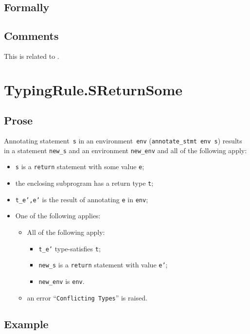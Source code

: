 \documentclass{book}
\begin{document}
\begin{emptyformal}
    \subsection{Formally}      
\end{emptyformal}

\subsection{Comments}
    This is related to .

\section{TypingRule.SReturnSome \label{sec:TypingRule.SReturnSome}}

  \subsection{Prose}
Annotating statement~\texttt{s} in an environment~\texttt{env}
(\texttt{annotate\_stmt env s}) results in a statement \texttt{new\_s} and an
environment \texttt{new\_env} and all of the following apply:
   \begin{itemize}
   \item \texttt{s} is a \texttt{return} statement with some value \texttt{e};
   \item the enclosing subprogram has a return type \texttt{t};
   \item \texttt{t\_e',e'} is the result of annotating \texttt{e} in \texttt{env};
   \item One of the following applies:
     \begin{itemize}
     \item All of the following apply:
       \begin{itemize}
       \item \texttt{t\_e'} type-satisfies \texttt{t};
       \item \texttt{new\_s} is a \texttt{return} statement with value \texttt{e'};
       \item \texttt{new\_env} is \texttt{env}.
       \end{itemize}
     \item an error ``\texttt{Conflicting Types}'' is raised.
     \end{itemize}
   \end{itemize}

  \subsection{Example}
\end{document}
